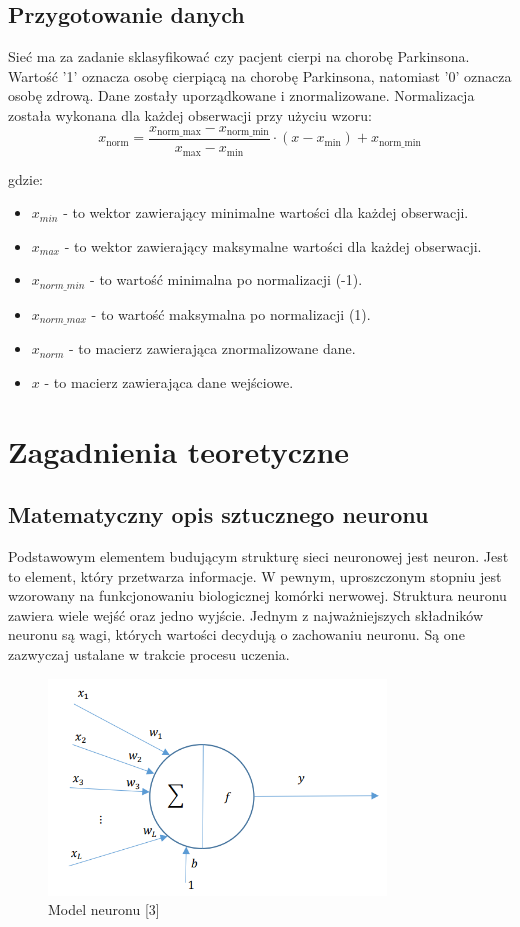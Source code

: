 \documentclass{article}
\begin{document}
\subsection{Przygotowanie danych}
Sieć ma za zadanie sklasyfikować czy pacjent cierpi na chorobę Parkinsona. Wartość '1' oznacza osobę cierpiącą na chorobę Parkinsona, natomiast '0' oznacza osobę zdrową.
Dane zostały uporządkowane i znormalizowane.
Normalizacja została wykonana dla każdej obserwacji przy użyciu wzoru:
\[
    x_{\text{norm}} = \frac{{x_{\text{norm\_max}} - x_{\text{norm\_min}}}}{{x_{\text{max}} - x_{\text{min}}}} \cdot (x - x_{\text{min}}) + x_{\text{norm\_min}}
\]

gdzie:
\begin{itemize}
    \item $x_{min}$ - to wektor zawierający minimalne wartości dla każdej obserwacji.
    \item $x_{max}$ - to wektor zawierający maksymalne wartości dla każdej obserwacji.
    \item $x_{norm\_min}$ - to wartość minimalna po normalizacji (-1).
    \item $x_{norm\_max}$ - to wartość maksymalna po normalizacji (1).
    \item $x_{norm}$ - to macierz zawierająca znormalizowane dane.
    \item $x$ - to macierz zawierająca dane wejściowe.
\end{itemize}
\newpage
\section{Zagadnienia teoretyczne}
\subsection{Matematyczny opis sztucznego neuronu}
Podstawowym elementem budującym strukturę sieci neuronowej jest neuron. Jest to element, który przetwarza informacje.
W pewnym, uproszczonym stopniu jest wzorowany na funkcjonowaniu biologicznej komórki nerwowej.
Struktura neuronu zawiera wiele wejść oraz jedno wyjście.
Jednym z najważniejszych składników neuronu są wagi, których wartości decydują o zachowaniu neuronu. Są one zazwyczaj ustalane w trakcie procesu uczenia.

\begin{figure}[H]
    \centering
    \includegraphics[width=0.8\textwidth, keepaspectratio]{model_neuronu.png}
    \caption{Model neuronu [3]}
    \label{fig:zdjecie}
\end{figure}
\end{document}
